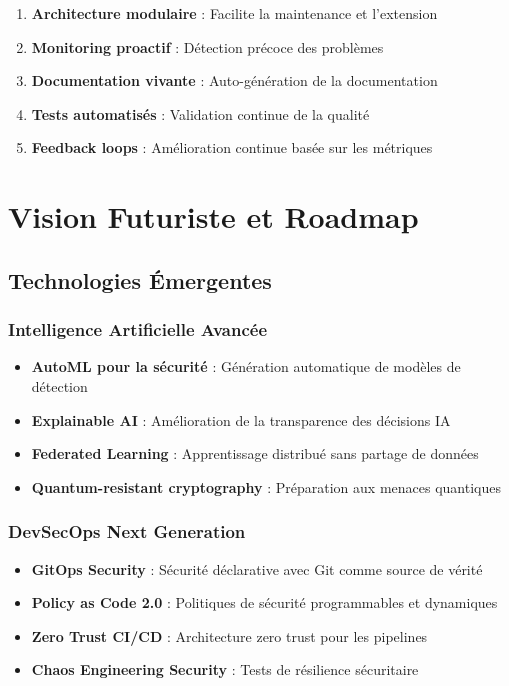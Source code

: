 \documentclass[12pt,a4paper]{report}
\begin{document}
\begin{enumerate}
    \item \textbf{Architecture modulaire} : Facilite la maintenance et l'extension
    \item \textbf{Monitoring proactif} : Détection précoce des problèmes
    \item \textbf{Documentation vivante} : Auto-génération de la documentation
    \item \textbf{Tests automatisés} : Validation continue de la qualité
    \item \textbf{Feedback loops} : Amélioration continue basée sur les métriques
\end{enumerate}

\section{Vision Futuriste et Roadmap}

\subsection{Technologies Émergentes}

\subsubsection{Intelligence Artificielle Avancée}
\begin{itemize}
    \item \textbf{AutoML pour la sécurité} : Génération automatique de modèles de détection
    \item \textbf{Explainable AI} : Amélioration de la transparence des décisions IA
    \item \textbf{Federated Learning} : Apprentissage distribué sans partage de données
    \item \textbf{Quantum-resistant cryptography} : Préparation aux menaces quantiques
\end{itemize}

\subsubsection{DevSecOps Next Generation}
\begin{itemize}
    \item \textbf{GitOps Security} : Sécurité déclarative avec Git comme source de vérité
    \item \textbf{Policy as Code 2.0} : Politiques de sécurité programmables et dynamiques
    \item \textbf{Zero Trust CI/CD} : Architecture zero trust pour les pipelines
    \item \textbf{Chaos Engineering Security} : Tests de résilience sécuritaire
\end{itemize}
\end{document}
